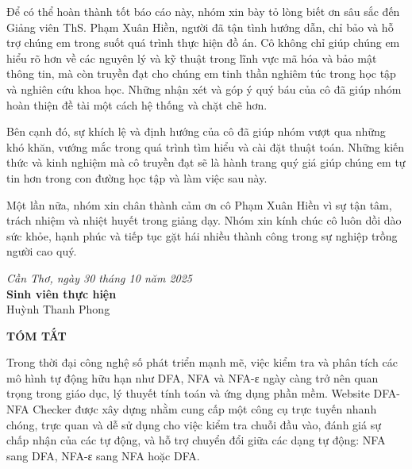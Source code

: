 \documentclass[12pt,a4paper]{report}
\begin{document}
Để có thể hoàn thành tốt báo cáo này, nhóm xin bày tỏ lòng biết ơn sâu sắc đến Giảng viên ThS. Phạm Xuân Hiền, người đã tận tình hướng dẫn, chỉ bảo và hỗ trợ chúng em trong suốt quá trình thực hiện đồ án. Cô không chỉ giúp chúng em hiểu rõ hơn về các nguyên lý và kỹ thuật trong lĩnh vực mã hóa và bảo mật thông tin, mà còn truyền đạt cho chúng em tinh thần nghiêm túc trong học tập và nghiên cứu khoa học. Những nhận xét và góp ý quý báu của cô đã giúp nhóm hoàn thiện đề tài một cách hệ thống và chặt chẽ hơn.

Bên cạnh đó, sự khích lệ và định hướng của cô đã giúp nhóm vượt qua những khó khăn, vướng mắc trong quá trình tìm hiểu và cài đặt thuật toán. Những kiến thức và kinh nghiệm mà cô truyền đạt sẽ là hành trang quý giá giúp chúng em tự tin hơn trong con đường học tập và làm việc sau này.

Một lần nữa, nhóm xin chân thành cảm ơn cô Phạm Xuân Hiền vì sự tận tâm, trách nhiệm và nhiệt huyết trong giảng dạy. Nhóm xin kính chúc cô luôn dồi dào sức khỏe, hạnh phúc và tiếp tục gặt hái nhiều thành công trong sự nghiệp trồng người cao quý.
\vspace{1cm}
\begin{flushright}
    \textit{Cần Thơ, ngày 30 tháng 10 năm 2025}\\[4pt]
    \textbf{Sinh viên thực hiện}\\[72pt] %
    Huỳnh Thanh Phong\\
\end{flushright}

\newpage
\begin{center}
    {\Large\textbf{TÓM TẮT}}
\end{center}
\vspace{1cm}
\justifying
\hspace*{0.7cm} Trong thời đại công nghệ số phát triển mạnh mẽ, việc kiểm tra và phân tích các mô hình tự động hữu hạn như DFA, NFA và NFA-ε ngày càng trở nên quan trọng trong giáo dục, lý thuyết tính toán và ứng dụng phần mềm. Website DFA-NFA Checker được xây dựng nhằm cung cấp một công cụ trực tuyến nhanh chóng, trực quan và dễ sử dụng cho việc kiểm tra chuỗi đầu vào, đánh giá sự chấp nhận của các tự động, và hỗ trợ chuyển đổi giữa các dạng tự động: NFA sang DFA, NFA-ε sang NFA hoặc DFA.  
\end{document}
